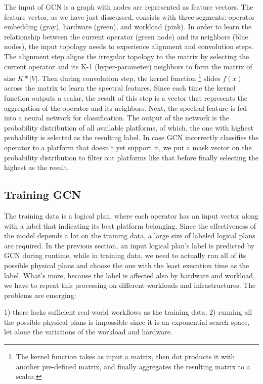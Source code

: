 The input of GCN is a graph with nodes are represented as feature vectors. 
The feature vector, as we have just disscussed, consists with three segments: operator embedding (gray), hardware (green), and workload (pink).
In order to learn the relationship between the current operator (green node) and its neighbors (blue nodes), 
the input topology needs to experience alignment and convolution steps.
The alignment step aligns the irregular topology to the matrix by selecting the current operator and its K-1 (hyper-parameter) neighbors to form the matrix of size $K * |V|$. 
Then during convolution step, the kernel function \footnote{The kernel function takes as input a matrix, 
then dot products it with another pre-defined matrix, 
and finally aggregates the resulting matrix to a scalar.} slides $f(x)$ across the matrix to learn the spectral features.
Since each time the kernel function outputs a scalar, the result of this step is a vector that represents the aggregation of the operator and its neighbors. 
Next, the spectral feature is fed into a neural network for classification.
The output of the network is the probability distribution of all available platforms,
of which, the one with highest probability is selected as the resulting label.
In case GCN incorrectly classifies the operator to a platform that doesn't yet support it, 
we put a mask vector on the probability distribution to filter out platforms like that before finally selecting the highest as the result.


\subsection{Training GCN}
The training data is a logical plan, where each operator has an input vector along with a label that indicating its best platform belonging.  
Since the effectiveness of the model depends a lot on the training data, a large size of labeled logical plans are required. 
In the previous section, an input logical plan's label is predicted by GCN during runtime, 
while in training data, we need to actually run all of its possible physical plans and choose the one with the least execution time as the label.
What's more, because the label is affected also by hardware and workload, we have to repeat this processing on different workloads and infrastructures.
The problems are emerging:

1) there lacks sufficient real-world workflows as the training data;
2) running all the possible physical plans is impossible since it is an exponential search space, let alone the variations of the workload and hardware.

